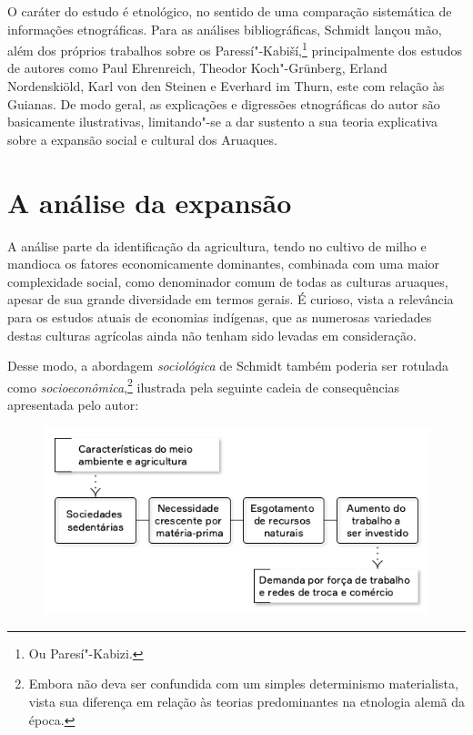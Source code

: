O caráter do estudo é etnológico, no sentido de uma comparação sistemática de informações etnográficas. Para as análises bibliográficas, Schmidt lançou mão, além dos próprios trabalhos sobre os Paressí"-Kabiší,\footnote{Ou Paresí"-Kabizi.} principalmente dos estudos de autores como Paul Ehrenreich, Theodor Koch"-Grünberg, Erland Nordenskiöld, Karl von den Steinen e Everhard im Thurn, este com relação às Guianas. De modo geral, as explicações e digressões etnográficas do autor são basicamente ilustrativas, limitando"-se a dar sustento a sua teoria explicativa sobre a expansão social e cultural dos Aruaques.

\section{A análise da expansão}

A análise parte da identificação da agricultura, tendo no cultivo de milho e mandioca os fatores economicamente dominantes, combinada com uma maior complexidade social, como denominador comum de todas as culturas aruaques, apesar de sua grande diversidade em termos gerais. É curioso, vista a relevância para os estudos atuais de economias indígenas, que as numerosas variedades destas culturas agrícolas ainda não tenham sido levadas em consideração.

Desse modo, a abordagem \textit{sociológica} de Schmidt também poderia ser
rotulada como \textit{socioeconômica},\footnote{Embora não deva ser confundida com um
simples determinismo materialista, vista sua diferença em relação às teorias
predominantes na etnologia alemã da época.} ilustrada pela seguinte cadeia de 
consequências apresentada pelo autor:

\begin{figure}[H]
  \includegraphics[width=\textwidth]{./TABELA.png}  
\end{figure}

